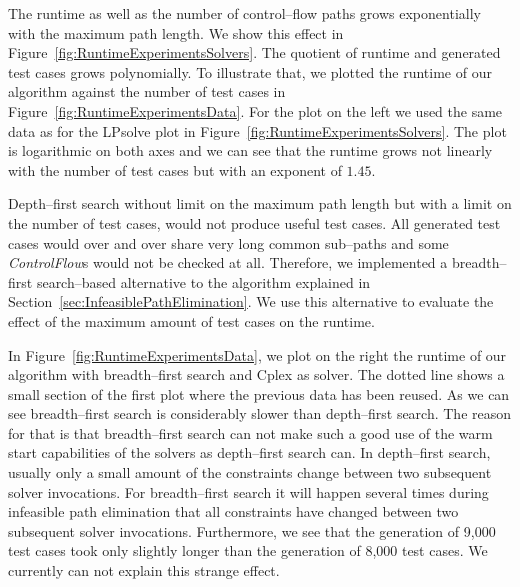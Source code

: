 \documentclass[runningheads,a4paper]{llncs}%
\newcommand{\UMLType}[1]{\textsf{\textit{#1}}} %
\begin{document}
The runtime as well as the number of control--flow paths grows exponentially
with the maximum path length. We show this effect in
Figure~\ref{fig:RuntimeExperimentsSolvers}. The quotient of runtime and
generated test cases grows polynomially. To illustrate that, we plotted the
runtime of our algorithm against the number of test cases in
Figure~\ref{fig:RuntimeExperimentsData}. For the plot on the left we used the
same data as for the LPsolve plot in Figure~\ref{fig:RuntimeExperimentsSolvers}.
The plot is logarithmic on both axes and we can see that the runtime grows not
linearly with the number of test cases but with an exponent of $1.45$.

Depth--first search without limit on the maximum path length but with a limit on
the number of test cases, would not produce useful test cases. All generated
test cases would over and over share very long common sub--paths and some
\UMLType{ControlFlow}s would not be checked at all. Therefore, we implemented a
breadth--first search--based alternative to the algorithm explained in
Section~\ref{sec:InfeasiblePathElimination}. We use this alternative to evaluate
the effect of the maximum amount of test cases on the runtime.

In Figure~\ref{fig:RuntimeExperimentsData}, we plot on the right the runtime of
our algorithm with breadth--first search and Cplex as solver. The dotted line
shows a small section of the first plot where the previous data has been reused.
As we can see breadth--first search is considerably slower than depth--first
search. The reason for that is that breadth--first search can not make such a
good use of the warm start capabilities of the solvers as depth--first search
can. In depth--first search, usually only a small amount of the constraints
change between two subsequent solver invocations. For breadth--first search it
will happen several times during infeasible path elimination that all
constraints have changed between two subsequent solver invocations. Furthermore,
we see that the generation of 9,000 test cases took only slightly longer than
the generation of 8,000 test cases. We currently can not explain this strange
effect.
\end{document}
